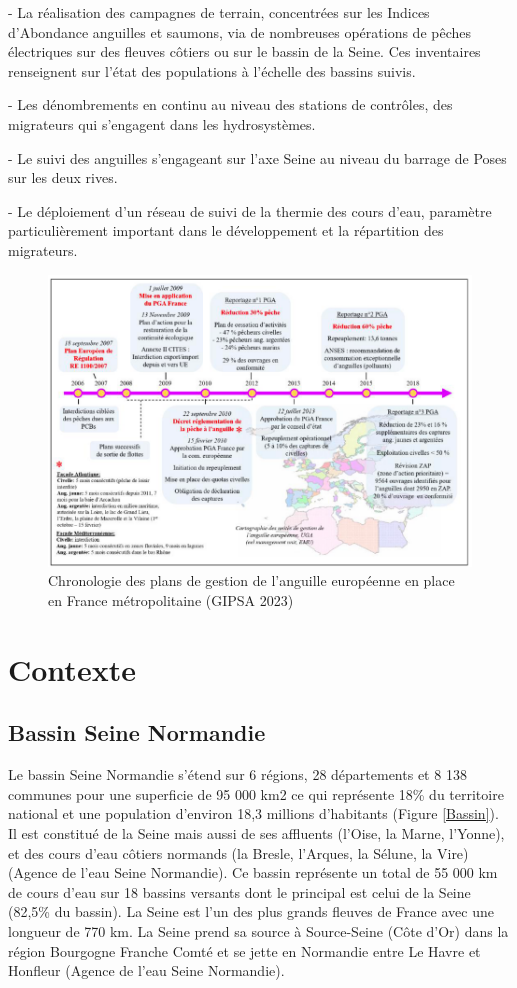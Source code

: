\documentclass[11pt,titlepage,twoside]{article}\usepackage[]{graphicx}\usepackage[table]{xcolor}
\begin{document}
- La réalisation des campagnes de terrain, concentrées sur les Indices d’Abondance anguilles et saumons, via de nombreuses opérations de pêches électriques sur des fleuves côtiers ou sur le bassin de la Seine. Ces inventaires renseignent sur l’état des populations à l’échelle des bassins suivis. 

- Les dénombrements en continu au niveau des stations de contrôles, des migrateurs qui s’engagent dans les hydrosystèmes. 

- Le suivi des anguilles s’engageant sur l’axe Seine au niveau du barrage de Poses sur les deux rives. 

- Le déploiement d’un réseau de suivi de la thermie des cours d’eau, paramètre particulièrement important dans le développement et la répartition des migrateurs. 

\begin{figure}[htpb]
\centering
\includegraphics[width=\textwidth]{PGA}
\caption{Chronologie des plans de gestion de l’anguille européenne en place en France métropolitaine (GIPSA 2023)}
\label{PGA}
\end{figure}

\section{Contexte}

\subsection{Bassin Seine Normandie}


Le bassin Seine Normandie s’étend sur 6 régions, 28 départements et 8 138 communes pour une superficie de 95 000 km2 ce qui représente 18\% du territoire national et une population d’environ 18,3 millions d’habitants (Figure \ref{Bassin}). Il est constitué de la Seine mais aussi de ses affluents (l’Oise, la Marne, l’Yonne), et des cours d’eau côtiers normands (la Bresle, l’Arques, la Sélune, la Vire) (Agence de l’eau Seine Normandie). Ce bassin représente un total de 55 000 km de cours d’eau sur 18 bassins versants dont le principal est celui de la Seine (82,5\% du bassin). La Seine est l’un des plus grands fleuves de France avec une longueur de 770 km. La Seine prend sa source à Source-Seine (Côte d’Or) dans la région Bourgogne Franche Comté et se jette en Normandie entre Le Havre et Honfleur (Agence de l’eau Seine Normandie).
\end{document}
